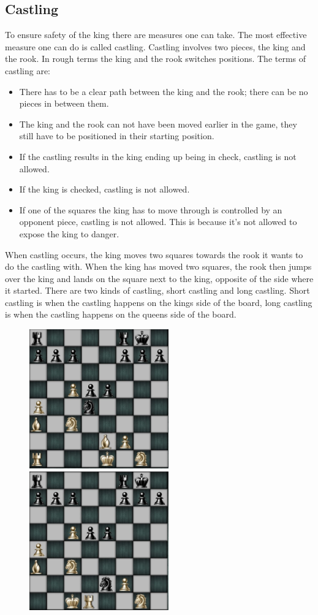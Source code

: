 \documentclass{article}
\begin{document}
\subsection*{Castling} To ensure safety of the king there are measures one can take. The most effective measure one can do is called castling. Castling involves two pieces, the king and the rook. In rough terms the king and the rook switches positions. The terms of castling are:
\begin{itemize}
	\item There has to be a clear path between the king and the rook; there can be no pieces in between them. 
	\item The king and the rook can not have been moved earlier in the game, they still have to be positioned in their starting position. 
	\item If the castling results in the king ending up being in check, castling is not allowed.
	\item If the king is checked, castling is not allowed.
	\item If one of the squares the king has to move through is controlled by an opponent piece, castling is not allowed. This is because it’s not allowed to expose the king to danger.
\end{itemize}
When castling occurs, the king moves two squares towards the rook it wants to do the castling with. When the king has moved two squares, the rook then jumps over the king and lands on the square next to the king, opposite of the side where it started.
There are two kinds of castling, short castling and long castling. Short castling is when the castling happens on the kings side of the board, long castling is when the castling happens on the queens side of the board.
\begin{figure}[h]
\includegraphics[width=6cm, height=6cm]{castling1} \includegraphics[width=6cm, height=6cm]{castling2} 
\end{figure}
\end{document}
